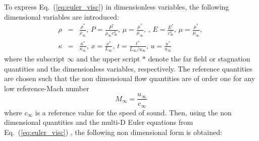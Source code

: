 \documentclass[preprint,10pt]{elsarticle}
\newcommand{\eqt}[1]{Eq.~(\ref{#1})}                     %
\begin{document}
To express \eqt{eq:euler_visc} in dimensionless variables, the following dimensional variables are introduced:
\begin{eqnarray}
\label{eq:norm_param}
\rho &=& \frac{\rho^*}{\rho_{\infty}} \text{, } P = \frac{P^*}{\rho_{\infty}c^2_{\infty}} \text{, } \mu = \frac{\mu^*}{\mu_{\infty}} \text{, } \text{, }  E = \frac{E^*}{c^2_{\infty} } \text{, } 
\mu = \frac{\mu^*}{\mu_{\infty}} \text{, }\nonumber \\
 \kappa &=& \frac{\kappa^*}{\kappa_{\infty}} \text{, }
x = \frac{x^*}{L_{\infty}} \text{, } t = \frac{t^*}{L_{\infty} / u_{\infty}} \text{, } u = \frac{u^*}{u_{\infty}}
\end{eqnarray}
where  the subscript $\infty$ and the upper script $*$ denote the far field or stagnation quantities and the dimensionless variables, respectively. The reference quantities are chosen such that the non dimensional flow quantities are of order one for any low reference-Mach number
\begin{equation}
M_{\infty} = \frac{u_{\infty}}{c_{\infty}}
\end{equation}
where $c_{\infty}$ is a reference value for the speed of sound.
Then, using the non dimensional quantities and the multi-D Euler equations from \eqt{eq:euler_visc} , the following non dimensional form is obtained:
\end{document}
